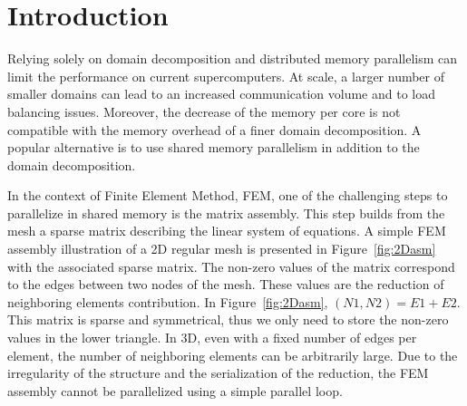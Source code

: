 \documentclass[10pt]{IOS-Book-Article}
\begin{document}
\section{Introduction}
\label{sec:intro}


Relying solely on domain decomposition and distributed memory parallelism can limit the performance on current supercomputers.
At scale, a larger number of smaller domains can lead to an increased communication volume and to load balancing issues.
Moreover, the decrease of the memory per core is not compatible with the memory overhead of a finer domain decomposition.
A popular alternative is to use shared memory parallelism in addition to the domain decomposition.

In the context of Finite Element Method, FEM, one of the challenging steps to parallelize in shared memory is the matrix assembly.
This step builds from the mesh a sparse matrix describing the linear system of equations.
A simple FEM assembly illustration of a 2D regular mesh is presented in Figure~\ref{fig:2Dasm} with the associated sparse matrix.
The non-zero values of the matrix correspond to the edges between two nodes of the mesh. These values are the reduction of neighboring elements contribution.
In Figure~\ref{fig:2Dasm}, $(N1,N2) = E1 + E2$. This matrix is sparse and symmetrical, thus we only need to store the non-zero values in the lower triangle.
In 3D, even with a fixed number of edges per element, the number of neighboring elements can be arbitrarily large.
Due to the irregularity of the structure and the serialization of the reduction, the FEM assembly cannot be parallelized using a simple parallel loop.
\end{document}
